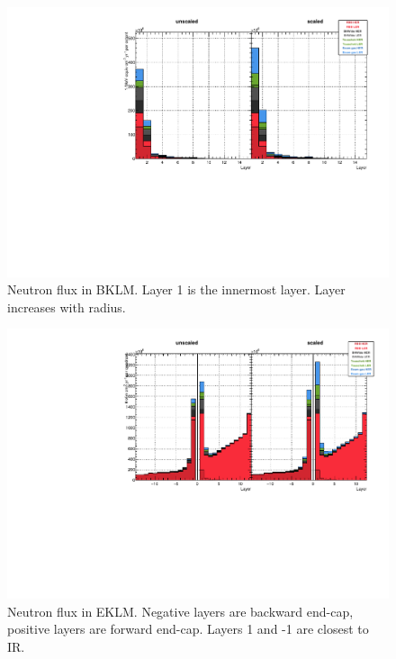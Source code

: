 \begin{figure}[htb]
	\centerfloat
		\includegraphics[width=\textwidth]{images/hBKLMFlux}
	\caption[Neutron flux in BKLM]{Neutron flux in BKLM. Layer 1 is the innermost layer. Layer increases with radius.}	
	\label{fig:BKLMFlux}
\end{figure}

\begin{figure}[htb]
	\centerfloat
		\includegraphics[width=\textwidth]{images/hEKLMFlux}
	\caption[Neutron flux in EKLM]{Neutron flux in EKLM. Negative layers are backward end-cap, positive layers are forward end-cap. Layers 1 and -1 are closest to IR.}	
	\label{fig:EKLMForFlux}
\end{figure}



